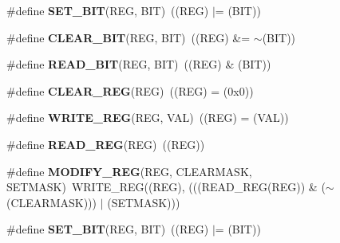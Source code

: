 \begin{DoxyCompactItemize}
\item 
\hypertarget{group___exported__macro_ga26474f43799fbade9cf300e21dd3a91a}{\#define {\bfseries S\-E\-T\-\_\-\-B\-I\-T}(R\-E\-G, B\-I\-T)~((R\-E\-G) $\vert$= (B\-I\-T))}\label{group___exported__macro_ga26474f43799fbade9cf300e21dd3a91a}

\item 
\hypertarget{group___exported__macro_ga133aae6fc0d41bffab39ab223a7001de}{\#define {\bfseries C\-L\-E\-A\-R\-\_\-\-B\-I\-T}(R\-E\-G, B\-I\-T)~((R\-E\-G) \&= $\sim$(B\-I\-T))}\label{group___exported__macro_ga133aae6fc0d41bffab39ab223a7001de}

\item 
\hypertarget{group___exported__macro_ga822bb1bb9710d5f2fa6396b84e583c33}{\#define {\bfseries R\-E\-A\-D\-\_\-\-B\-I\-T}(R\-E\-G, B\-I\-T)~((R\-E\-G) \& (B\-I\-T))}\label{group___exported__macro_ga822bb1bb9710d5f2fa6396b84e583c33}

\item 
\hypertarget{group___exported__macro_ga1378fbdda39f40b85420df55f41460ef}{\#define {\bfseries C\-L\-E\-A\-R\-\_\-\-R\-E\-G}(R\-E\-G)~((R\-E\-G) = (0x0))}\label{group___exported__macro_ga1378fbdda39f40b85420df55f41460ef}

\item 
\hypertarget{group___exported__macro_ga32f78bffcaf6d13023dcd7f05e0c4d57}{\#define {\bfseries W\-R\-I\-T\-E\-\_\-\-R\-E\-G}(R\-E\-G, V\-A\-L)~((R\-E\-G) = (V\-A\-L))}\label{group___exported__macro_ga32f78bffcaf6d13023dcd7f05e0c4d57}

\item 
\hypertarget{group___exported__macro_gae7f188a4d26c9e713a48414783421071}{\#define {\bfseries R\-E\-A\-D\-\_\-\-R\-E\-G}(R\-E\-G)~((R\-E\-G))}\label{group___exported__macro_gae7f188a4d26c9e713a48414783421071}

\item 
\hypertarget{group___exported__macro_ga6553c99f510c3bab8cc0a91602053247}{\#define {\bfseries M\-O\-D\-I\-F\-Y\-\_\-\-R\-E\-G}(R\-E\-G, C\-L\-E\-A\-R\-M\-A\-S\-K, S\-E\-T\-M\-A\-S\-K)~W\-R\-I\-T\-E\-\_\-\-R\-E\-G((R\-E\-G), (((R\-E\-A\-D\-\_\-\-R\-E\-G(R\-E\-G)) \& ($\sim$(C\-L\-E\-A\-R\-M\-A\-S\-K))) $\vert$ (S\-E\-T\-M\-A\-S\-K)))}\label{group___exported__macro_ga6553c99f510c3bab8cc0a91602053247}

\item 
\hypertarget{group___exported__macro_ga26474f43799fbade9cf300e21dd3a91a}{\#define {\bfseries S\-E\-T\-\_\-\-B\-I\-T}(R\-E\-G, B\-I\-T)~((R\-E\-G) $\vert$= (B\-I\-T))}\label{group___exported__macro_ga26474f43799fbade9cf300e21dd3a91a}


\end{DoxyCompactItemize}
